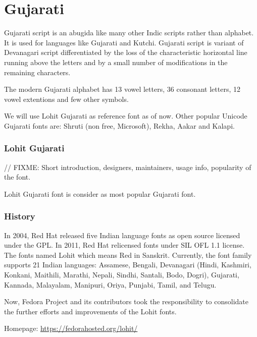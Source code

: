 \chapter{Gujarati}

Gujarati script is an abugida like many other Indic scripts rather than
alphabet. It is used for languages like Gujarati and Kutchi. Gujarati script is
variant of Devanagari script differentiated by the loss of the characteristic
horizontal line running above the letters and by a small number of
modifications in the remaining characters.

The modern Gujarati alphabet has 13 vowel letters, 36 consonant letters, 12
vowel extentions and few other symbols.


We will use Lohit Gujarati as reference font as of now. Other popular Unicode
Gujarati fonts are: Shruti (non free, Microsoft), Rekha, Aakar and Kalapi.

\subsection{Lohit Gujarati}
// FIXME: Short introduction, designers, maintainers, usage info, popularity of
the font.

Lohit Gujarati font is consider as most popular Gujarati font.

\subsection{History}
In 2004, Red Hat released five Indian language fonts as open source licensed
under the GPL. In 2011, Red Hat relicensed fonts under SIL OFL 1.1 license.
The fonts named Lohit which means Red in Sanskrit. Currently, the font family
supports 21 Indian languages: Assamese, Bengali, Devanagari (Hindi, Kashmiri,
Konkani, Maithili, Marathi, Nepali, Sindhi, Santali, Bodo, Dogri), Gujarati,
Kannada, Malayalam, Manipuri, Oriya, Punjabi, Tamil, and Telugu.

Now, Fedora Project and its contributors took the responsibility to consolidate
the further efforts and improvements of the Lohit fonts.

Homepage: {\url{https://fedorahosted.org/lohit/}}

